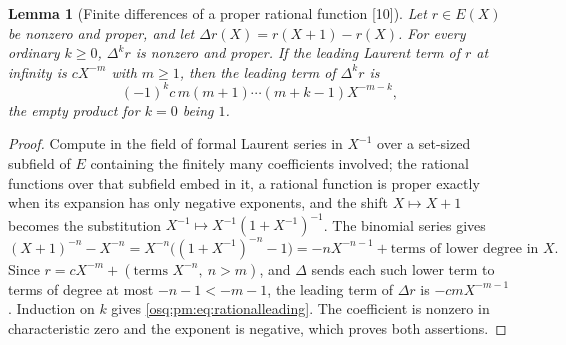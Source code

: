 \documentclass[11pt,letterpaper]{article}
\numberwithin{equation}{section}
\newtheorem{lemma}[lemma]{Lemma}
\theoremstyle{definition}
\theoremstyle{remark}
\theoremstyle{plain}
\newcommand{\src}[1]{\textup{\textsf{[#1]}}}
\begin{document}
\begin{lemma}[Finite differences of a proper rational function \src{10}]
\label{osq:pm:lem:rationaldiff}
Let $r\in E(X)$ be nonzero and proper, and let $\Delta r(X)=r(X+1)-r(X)$. For every
ordinary $k\ge0$, $\Delta^kr$ is nonzero and proper. If the leading Laurent term of $r$ at
infinity is $cX^{-m}$ with $m\ge1$, then the leading term of $\Delta^kr$ is
\begin{equation}\label{osq:pm:eq:rationalleading}
 (-1)^kc\,m(m+1)\cdots(m+k-1)X^{-m-k},
\end{equation}
the empty product for $k=0$ being $1$.
\end{lemma}
\begin{proof}
Compute in the field of formal Laurent series in $X^{-1}$ over a set-sized subfield of $E$
containing the finitely many coefficients involved; the rational functions over that
subfield embed in it, a rational function is proper exactly when its expansion has only
negative exponents, and the shift $X\mapsto X+1$ becomes the substitution
$X^{-1}\mapsto X^{-1}(1+X^{-1})^{-1}$. The binomial series gives
\[
 (X+1)^{-n}-X^{-n}=X^{-n}\bigl((1+X^{-1})^{-n}-1\bigr)
 =-nX^{-n-1}+\text{terms of lower degree in }X .
\]
Since $r=cX^{-m}+(\text{terms }X^{-n},\ n>m)$, and $\Delta$ sends each such lower term to
terms of degree at most $-n-1<-m-1$, the leading term of $\Delta r$ is $-cmX^{-m-1}$.
Induction on $k$ gives \eqref{osq:pm:eq:rationalleading}. The coefficient is nonzero in
characteristic zero and the exponent is negative, which proves both assertions.
\end{proof}
\end{document}
